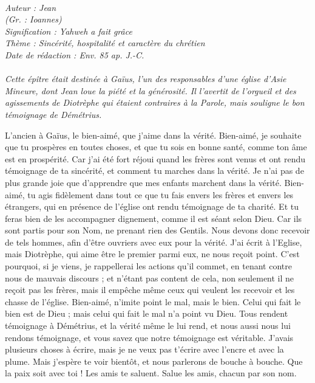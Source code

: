 \BFont
\noindent\hrulefill
{\footnotesize
\textit{
\bigskip
{\centering{}
\\Auteur : Jean
\\(Gr. : Ioannes)
\\Signification : Yahweh a fait grâce
\\Thème : Sincérité, hospitalité et caractère du chrétien
\\Date de rédaction : Env. 85 ap. J.-C.\\}
}
\textit{
\\Cette épître était destinée à Gaïus, l’un des responsables d’une église d’Asie Mineure, dont Jean loue la piété et la générosité. Il l’avertit de l’orgueil et des agissements de Diotrèphe qui étaient contraires à la Parole, mais souligne le bon témoignage de Démétrius.\bigskip
}
}
\par\nobreak\noindent\hrulefill
\begin{multicols}{2}
\VerseOne{}L'ancien à Gaïus, le bien-aimé, que j'aime dans la vérité.
Bien-aimé, je souhaite que tu prospères en toutes choses, et que tu sois en bonne santé, comme ton âme est en prospérité.
Car j’ai été fort réjoui quand les frères sont venus et ont rendu témoignage de ta sincérité, et comment tu marches dans la vérité.
Je n'ai pas de plus grande joie que d’apprendre que mes enfants marchent dans la vérité.
Bien-aimé, tu agis fidèlement dans tout ce que tu fais envers les frères et envers les étrangers,
qui en présence de l'église ont rendu témoignage de ta charité. Et tu feras bien de les accompagner dignement, comme il est séant selon Dieu.
Car ils sont partis pour son Nom, ne prenant rien des Gentils.
Nous devons donc recevoir de tels hommes, afin d’être ouvriers avec eux pour la vérité.
J'ai écrit à l'Eglise, mais Diotrèphe, qui aime être le premier parmi eux, ne nous reçoit point.
C'est pourquoi, si je viens, je rappellerai les actions qu'il commet, en tenant contre nous de mauvais discours ; et n'étant pas content de cela, non seulement il ne reçoit pas les frères, mais il empêche même ceux qui veulent les recevoir et les chasse de l'église.
Bien-aimé, n'imite point le mal, mais le bien. Celui qui fait le bien est de Dieu ; mais celui qui fait le mal n'a point vu Dieu.
Tous rendent témoignage à Démétrius, et la vérité même le lui rend, et nous aussi nous lui rendons témoignage, et vous savez que notre témoignage est véritable.
J'avais plusieurs choses à écrire, mais je ne veux pas t'écrire avec l'encre et avec la plume.
Mais j'espère te voir bientôt, et nous parlerons de bouche à bouche.
Que la paix soit avec toi ! Les amis te saluent. Salue les amis, chacun par son nom.
\PPE{}
\end{multicols}
